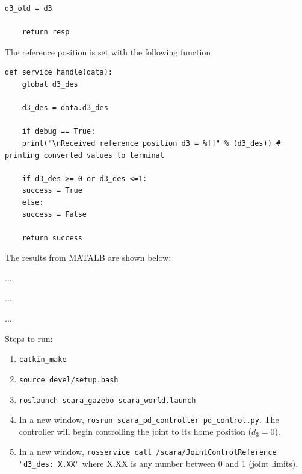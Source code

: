 \documentclass[10pt]{article}
\begin{document}
\begin{enumerate}
\begin{lstlisting}[style=Matlab-editor,basicstyle=\mlttfamily,escapechar=`]
	d3_old = d3
	
	return resp
\end{lstlisting} 

	The reference position is set with the following function
	
\begin{lstlisting}[style=Matlab-editor,basicstyle=\mlttfamily,escapechar=`]
def service_handle(data):
	global d3_des
	
	d3_des = data.d3_des
	
	if debug == True:
	print("\nReceived reference position d3 = %f]" % (d3_des)) # printing converted values to terminal
	
	if d3_des >= 0 or d3_des <=1:
	success = True
	else:
	success = False
	
	return success
\end{lstlisting} 


	The results from MATALB are shown below:
	
	...
	
	...
	
	...

	Steps to run:
	
	\begin{enumerate}
		\item \texttt{catkin\_make}
		\item \texttt{source devel/setup.bash}
		\item \texttt{roslaunch scara\_gazebo scara\_world.launch}
		\item In a new window, \texttt{rosrun scara\_pd\_controller pd\_control.py}. The controller will begin controlling the joint to its home position ($d_3 = 0$).
		\item In a new window, \texttt{rosservice call /scara/JointControlReference "d3\_des: X.XX"} where X.XX is any number between 0 and 1 (joint limits).
		
	\end{enumerate}

\end{enumerate}
\end{document}
